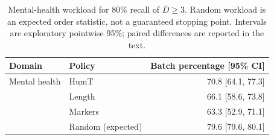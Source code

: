 \begin{table}[htbp]
\centering\small
\caption{Mental-health workload for 80\% recall of $\overline D\geq3$. Random workload is an expected order statistic, not a guaranteed stopping point. Intervals are exploratory pointwise 95\%; paired differences are reported in the text.}
\label{tab:workload}
\begin{tabular}{llr}
\toprule
Domain & Policy & Batch percentage [95\% CI] \\
\midrule
Mental health & HumT & 70.8 [64.1, 77.3] \\
 & Length & 66.1 [58.6, 73.8] \\
 & Markers & 63.3 [52.9, 71.1] \\
 & Random (expected) & 79.6 [79.6, 80.1] \\
\bottomrule
\end{tabular}
\end{table}
